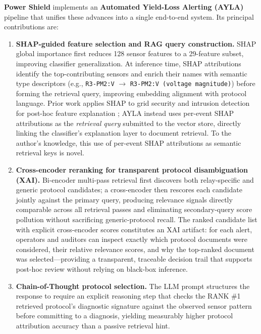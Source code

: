 \documentclass[twocolumn, 10pt, letterpaper]{article}
\begin{document}
\textbf{Power Shield} implements an \textbf{Automated Yield-Loss Alerting (AYLA)}
pipeline that unifies these advances into a single end-to-end system.
Its principal contributions are:

\begin{enumerate}
    \item[\textbf{C1.}] \textbf{SHAP-guided feature selection and RAG query construction.}
          SHAP global importance first reduces 128 sensor features to a 29-feature subset,
          improving classifier generalization.
          At inference time, SHAP attributions identify the top-contributing sensors
          and enrich their names with semantic type descriptors (e.g.,
          \texttt{R3-PM2:V} $\rightarrow$ \texttt{R3-PM2:V (voltage magnitude)})
          before forming the retrieval query, improving embedding alignment with
          protocol language.
          Prior work applies SHAP to grid security and intrusion detection for
          post-hoc feature explanation \cite{shap_ids,shapgrid2026};
          AYLA instead uses per-event SHAP attributions as the \textit{retrieval
          query} submitted to the vector store, directly linking the classifier's
          explanation layer to document retrieval.
          To the author's knowledge, this use of per-event SHAP attributions
          as semantic retrieval keys is novel.

    \item[\textbf{C2.}] \textbf{Cross-encoder reranking for transparent protocol disambiguation (XAI).}
          Bi-encoder multi-pass retrieval first discovers both relay-specific and
          generic protocol candidates; a cross-encoder then rescores each candidate
          jointly against the primary query, producing relevance signals directly
          comparable across all retrieval passes and eliminating secondary-query
          score pollution without sacrificing generic-protocol recall.
          The ranked candidate list with explicit cross-encoder scores constitutes
          an XAI artifact: for each alert, operators and auditors can inspect
          exactly which protocol documents were considered, their relative
          relevance scores, and why the top-ranked document was selected---providing
          a transparent, traceable decision trail that supports post-hoc review
          without relying on black-box inference.

    \item[\textbf{C3.}] \textbf{Chain-of-Thought protocol selection.} The LLM prompt structures
          the response to require an explicit reasoning step that checks the
          RANK \#1 retrieved protocol's diagnostic signature against the observed
          sensor pattern before committing to a diagnosis, yielding measurably
          higher protocol attribution accuracy than a passive retrieval hint.


\end{enumerate}
\end{document}
